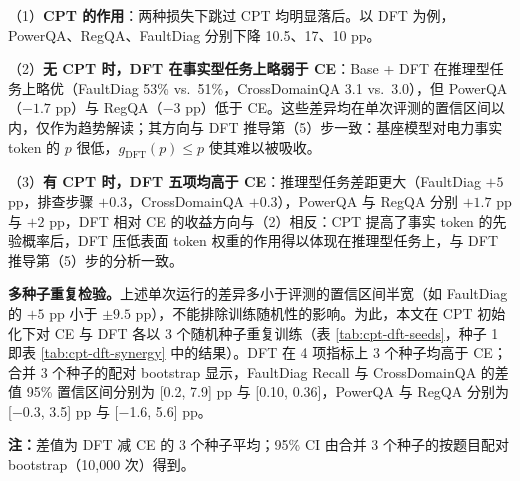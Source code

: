 \documentclass[fontset=fandol,type=master,campus=shenzhen,etitleauto=true]{hithesisbook}
\begin{document}
（1）\textbf{CPT 的作用}：两种损失下跳过 CPT 均明显落后。以 DFT 为例，PowerQA、RegQA、FaultDiag 分别下降 10.5、17、10 pp。

（2）\textbf{无 CPT 时，DFT 在事实型任务上略弱于 CE}：Base + DFT 在推理型任务上略优（FaultDiag 53\% vs.\ 51\%，CrossDomainQA 3.1 vs.\ 3.0），但 PowerQA（$-1.7$ pp）与 RegQA（$-3$ pp）低于 CE。这些差异均在单次评测的置信区间以内，仅作为趋势解读；其方向与 DFT 推导第（5）步一致：基座模型对电力事实 token 的 $p$ 很低，$g_{\text{DFT}}(p) \le p$ 使其难以被吸收。

（3）\textbf{有 CPT 时，DFT 五项均高于 CE}：推理型任务差距更大（FaultDiag $+5$ pp，排查步骤 $+0.3$，CrossDomainQA $+0.3$），PowerQA 与 RegQA 分别 $+1.7$ pp 与 $+2$ pp，DFT 相对 CE 的收益方向与（2）相反：CPT 提高了事实 token 的先验概率后，DFT 压低表面 token 权重的作用得以体现在推理型任务上，与 DFT 推导第（5）步的分析一致。

\textbf{多种子重复检验。}上述单次运行的差异多小于评测的置信区间半宽（如 FaultDiag 的 $+5$ pp 小于 $\pm 9.5$ pp），不能排除训练随机性的影响。为此，本文在 CPT 初始化下对 CE 与 DFT 各以 3 个随机种子重复训练（表 \ref{tab:cpt-dft-seeds}，种子 1 即表 \ref{tab:cpt-dft-synergy} 中的结果）。DFT 在 4 项指标上 3 个种子均高于 CE；合并 3 个种子的配对 bootstrap 显示，FaultDiag Recall 与 CrossDomainQA 的差值 95\% 置信区间分别为 [0.2, 7.9] pp 与 [0.10, 0.36]，PowerQA 与 RegQA 分别为 [$-$0.3, 3.5] pp 与 [$-$1.6, 5.6] pp。

\begin{table}[htbp]
\centering
\caption{CPT 初始化下 CE 与 DFT 的多种子重复结果（3 个随机种子）}
\label{tab:cpt-dft-seeds}
\small
\setlength{\tabcolsep}{4pt}
\renewcommand{\arraystretch}{1.15}

\vspace{0.2cm}
{\small \textbf{注：}差值为 DFT 减 CE 的 3 个种子平均；95\% CI 由合并 3 个种子的按题目配对 bootstrap（10{,}000 次）得到。}
\end{table}
\end{document}

